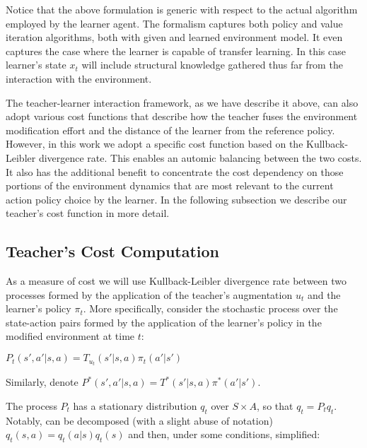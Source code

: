 \documentclass[letterpaper]{aamas2009}
\begin{document}
Notice that the above formulation is generic with respect to the
actual algorithm employed by the learner agent. The formalism captures
both policy and value iteration algorithms, both with given and
learned environment model. It even captures the case where the learner
is capable of transfer learning. In this case learner's state $x_t$
will include structural knowledge gathered thus far from the
interaction with the environment. 

The teacher-learner interaction framework, as we have describe it
above, can also adopt various cost functions that describe how the
teacher fuses the environment modification effort and the distance of
the learner from the reference policy. However, in this work we adopt
a specific cost function based on the Kullback-Leibler divergence
rate. This enables an automic balancing between the two costs. It also
has the additional benefit to concentrate the cost dependency on those
portions of the environment dynamics that are most relevant to the
current action policy choice by the learner. In the following
subsection we describe our teacher's cost function in more detail.

\subsection{Teacher's Cost Computation}
As a measure of cost we will use Kullback-Leibler divergence rate
between two processes formed by the application of the teacher's
augmentation $u_t$ and the learner's policy $\pi_t$. More specifically,
consider the stochastic process over the state-action pairs formed by
the application of the learner's policy in the modified environment at
time $t$: \\
\centerline{$
P_t(s',a'|s,a)=T_{u_t}(s'|s,a)\pi_t(a'|s')
$}

Similarly, denote $P^*(s',a'|s,a)=T^*(s'|s,a)\pi^*(a'|s')$.

The process $P_t$ has a stationary distribution $q_t$ over
  $S\times A$, so that $q_t=P_tq_t$. Notably, can be decomposed (with
  a slight abuse of notation) $q_t(s,a)=q_t(a|s)q_t(s)$ and then,
  under some conditions, simplified:
\end{document}
